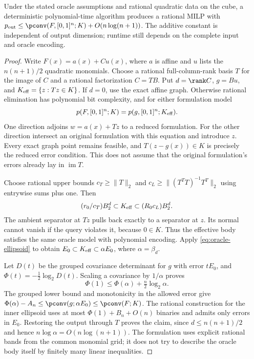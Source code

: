 \begin{theorem}\label{thm:general-quadratic-body}
Under the stated oracle assumptions and rational quadratic data on the
cube, a deterministic polynomial-time algorithm produces a rational MILP
with $p_{\rm out}\le\pconv(F,[0,1]^n;K)+O(n\log(n+1))$. The additive
constant is independent of output dimension; runtime still depends on
the complete input and oracle encoding.
\end{theorem}
\begin{proof}
Write $F(x)=a(x)+Cu(x)$, where $a$ is affine and $u$ lists the
$n(n+1)/2$ quadratic monomials. Choose a rational full-column-rank basis
$T$ for the image of $C$ and a rational factorization $C=TB$. Put
$d=\rank C$, $g=Bu$, and $K_{\rm eff}=\{z:Tz\in K\}$. If $d=0$,
use the exact affine graph. Otherwise rational elimination has polynomial
bit complexity, and for either formulation model
\begin{equation}\label{eq:output-image-equivalence}
 p(F,[0,1]^n;K)=p(g,[0,1]^n;K_{\rm eff}).
\end{equation}
One direction adjoins $w=a(x)+Tz$ to a reduced formulation. For the
other direction intersect an original formulation with this equation and
introduce $z$. Every exact graph point remains feasible, and
$T(z-g(x))\in K$ is precisely the reduced error condition. This does
not assume that the original formulation's errors already lay in
$\operatorname{im}T$.

Choose rational upper bounds $c_T\ge\|T\|_2$ and
$c_L\ge\|(T^TT)^{-1}T^T\|_2$ using entrywise sums plus one. Then
\[
 (r_0/c_T)B_2^d\subset K_{\rm eff}\subset(R_0c_L)B_2^d.
\]
The ambient separator at $Tz$ pulls back exactly to a separator at $z$.
Its normal cannot vanish if the query violates it, because $0\in K$.
Thus the effective body satisfies the same oracle model with polynomial
encoding. Apply \eqref{eq:oracle-ellipsoid} to obtain
$E_0\subset K_{\rm eff}\subset\alpha E_0$, where $\alpha=\beta_d$.

Let $D(t)$ be the grouped covariance determinant for $g$ with error
$tE_0$, and $\Phi(t)=-\frac12\log_2D(t)$. Scaling a covariance by
$1/\alpha$ proves
\begin{equation}\label{eq:body-rounding-loss}
 \Phi(1)\le\Phi(\alpha)+\tfrac n2\log_2\alpha.
\end{equation}
The grouped lower bound and monotonicity in the allowed error give
$\Phi(\alpha)-A_n\le\pconv(g;\alpha E_0)\le\pconv(F;K)$.
The rational construction for the inner ellipsoid uses at most
$\Phi(1)+B_n+O(n)$ binaries and admits only errors in $E_0$.
Restoring the output through $T$ proves the claim, since
$d\le n(n+1)/2$ and hence $n\log\alpha=O(n\log(n+1))$.
The formulation uses explicit rational bands from the common monomial
grid; it does not try to describe the oracle body itself by finitely
many linear inequalities.
\end{proof}

